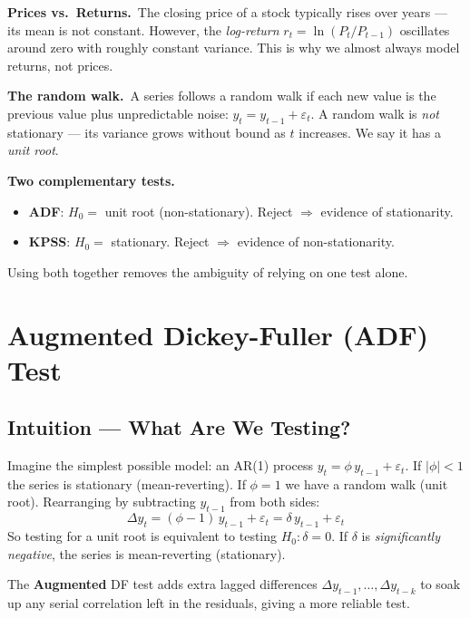 \documentclass[10pt,a4paper,twocolumn]{article}
\begin{document}
\noindent\textbf{Prices vs.\ Returns.}~The closing price of a stock
typically rises over years --- its mean is not constant.  However,
the \emph{log-return} $r_t = \ln(P_t/P_{t-1})$ oscillates around
zero with roughly constant variance.  This is why we almost always
model returns, not prices.

\noindent\textbf{The random walk.}~A series follows a random walk
if each new value is the previous value plus unpredictable noise:
$y_t = y_{t-1} + \varepsilon_t$.
A random walk is \emph{not} stationary --- its variance grows
without bound as $t$ increases.  We say it has a \emph{unit root}.

\noindent\textbf{Two complementary tests.}~
\begin{itemize}\setlength\itemsep{0pt}
  \item \textbf{ADF}: $H_0 =$ unit root (non-stationary).
        Reject $\Rightarrow$ evidence of stationarity.
  \item \textbf{KPSS}: $H_0 =$ stationary.
        Reject $\Rightarrow$ evidence of non-stationarity.
\end{itemize}
Using both together removes the ambiguity of relying on one test alone.

\section{Augmented Dickey-Fuller (ADF) Test}

\subsection{Intuition --- What Are We Testing?}

Imagine the simplest possible model: an AR(1) process
$y_t = \phi\,y_{t-1} + \varepsilon_t$.  If $|\phi|<1$ the series is
stationary (mean-reverting).  If $\phi=1$ we have a random walk
(unit root).  Rearranging by subtracting $y_{t-1}$ from both sides:
\[
  \Delta y_t = (\phi-1)\,y_{t-1} + \varepsilon_t = \delta\,y_{t-1} + \varepsilon_t
\]
So testing for a unit root is equivalent to testing $H_0:\delta=0$.
If $\delta$ is \emph{significantly negative}, the series is
mean-reverting (stationary).

The \textbf{Augmented} DF test adds extra lagged differences
$\Delta y_{t-1},\ldots,\Delta y_{t-k}$ to soak up any serial
correlation left in the residuals, giving a more reliable test.
\end{document}
